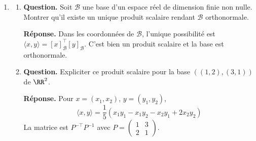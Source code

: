\documentclass[12pt, a4paper]{article}
\begin{document}
\begin{enumerate}[label=8.\arabic*., start=70]
\begin{minipage}[t]{\linewidth}
\begin{enumerate}[\arabic*.]
        \item \textbf{Question.} Montrer qu’il s’agit d’un produit scalaire.
\par\smallskip
\textbf{Réponse.} La somme est finie pour des polynômes, symétrique et bilinéaire.
        $\langle P,P\rangle=\sum_k(P^{(k)}(1))^2\geq0$.
        Si elle est nulle, toutes les dérivées en $1$ sont nulles, donc $P=0$ par Taylor.

  \item \textbf{Question.} Montrer que $((X-1)^n)_{n\in\NN}$ est une base orthogonale.
\par\smallskip
\textbf{Réponse.} $((X-1)^n)^{(k)}(1)=n!$ si $k=n$, et $0$ sinon.
        Donc ces polynômes sont orthogonaux, de normes $n!$, et forment une base par leurs degrés.

  \item \textbf{Question.} Déterminer $(\RR{}[X]_{\leq n})^\perp$.
\par\smallskip
\textbf{Réponse.} $\RR{}[X]_{\leq n}^\perp=(X-1)^{n+1}\RR{}[X]$, car l'orthogonalité impose $P^{(k)}(1)=0$ pour $0\leq k\leq n$.

\end{enumerate}
\end{minipage}

  \item \begin{minipage}[t]{\linewidth}\raggedright
\begin{enumerate}[\arabic*.]
        \item \textbf{Question.} Soit $\mathcal B$ une base d’un espace réel de dimension finie non nulle. Montrer qu’il existe un unique produit scalaire rendant $\mathcal B$ orthonormale.
\par\smallskip
\textbf{Réponse.} Dans les coordonnées de $\mathcal B$, l'unique possibilité est
        $\langle x,y\rangle=[x]_{\mathcal B}^\top[y]_{\mathcal B}$.
        C'est bien un produit scalaire et la base est orthonormale.

  \item \textbf{Question.} Expliciter ce produit scalaire pour la base $((1,2),(3,1))$ de $\RR^2$.
\par\smallskip
\textbf{Réponse.} Pour $x=(x_1,x_2)$, $y=(y_1,y_2)$,
        \[
          \langle x,y\rangle=\frac15(x_1y_1-x_1y_2-x_2y_1+2x_2y_2)
        \]
        La matrice est $P^{-\top}P^{-1}$ avec $P=\begin{pmatrix}1&3\\2&1\end{pmatrix}$.


\end{enumerate}
\end{minipage}
\end{enumerate}
\end{document}
